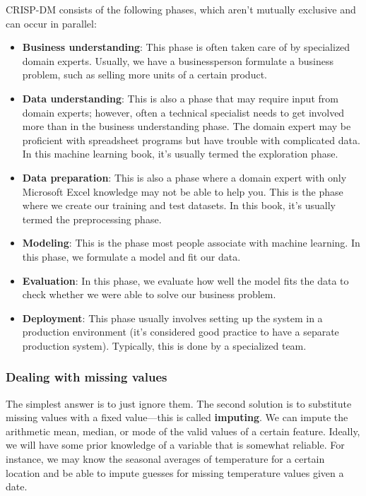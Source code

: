 CRISP-DM consists of the following phases, which aren't mutually exclusive and can
occur in parallel:
\begin{itemize}
    \item \textbf{Business understanding}: This phase is often taken care of by specialized domain experts. Usually, we have a businessperson formulate a business problem, such as selling more units of a certain product.
    \item \textbf{Data understanding}: This is also a phase that may require input from domain experts; however, often a technical specialist needs to get involved more than in the business understanding phase. The domain expert may be proficient with spreadsheet programs but have trouble with complicated data. In this machine learning book, it's usually termed the exploration phase.
    \item \textbf{Data preparation}: This is also a phase where a domain expert with only Microsoft Excel knowledge may not be able to help you. This is the phase where we create our training and test datasets. In this book, it's usually termed the preprocessing phase.
    \item \textbf{Modeling}: This is the phase most people associate with machine learning. In this phase, we formulate a model and fit our data.
    \item \textbf{Evaluation}: In this phase, we evaluate how well the model fits the data to check whether we were able to solve our business problem.
    \item \textbf{Deployment}: This phase usually involves setting up the system in a production environment (it's considered good practice to have a separate production system). Typically, this is done by a specialized team.
\end{itemize}
\subsubsection*{Dealing with missing values}
The simplest answer is to just ignore them. The second solution is to substitute missing values with a fixed value—this is called \textbf{imputing}. We can impute the arithmetic mean, median, or mode of the valid values of a certain feature. Ideally, we will have some prior knowledge of a variable that is somewhat reliable. For instance, we may know the seasonal averages of temperature for a certain location and be able to impute guesses for missing temperature values given a date.
